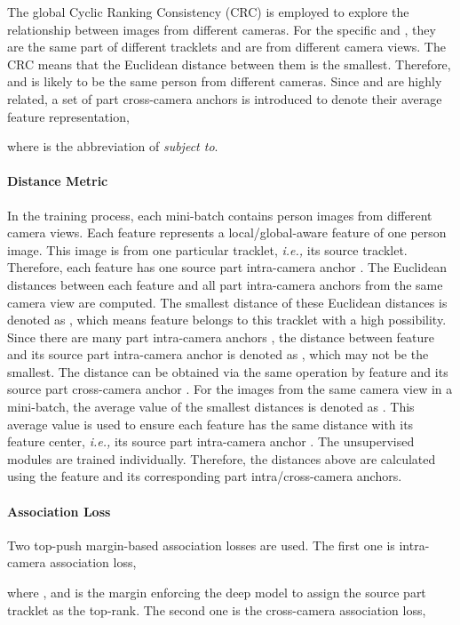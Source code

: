 \documentclass{cta-author}
\begin{document}
	The global Cyclic Ranking Consistency (CRC) \cite{RN187} is employed to explore the relationship between images from different cameras. For the specific  and , they are the same part of different tracklets and are from different camera views. The CRC means that the Euclidean distance between them is the smallest. Therefore,  and  is likely to be the same person from different cameras. Since  and  are highly related, a set of part cross-camera anchors  is introduced to denote their average feature representation, 
	
	where  is the abbreviation of \textit{subject to}.
	
	\paragraph{Distance Metric}
	In the training process, each mini-batch contains  person images from different camera views. Each feature  represents a local/global-aware feature of one person image. This image is from one particular tracklet, \textit{i.e.,} its source tracklet. Therefore, each feature  has one source part intra-camera anchor . The Euclidean distances between each feature  and all part intra-camera anchors  from the same camera view are computed. The smallest distance of these Euclidean distances is denoted as , which means feature  belongs to this tracklet with a high possibility. Since there are many part intra-camera anchors , the distance between feature  and its source part intra-camera anchor  is denoted as , which may not be the smallest. The distance  can be obtained via the same operation by feature  and its source part cross-camera anchor . For the images from the same camera view in a mini-batch, the average value of the smallest distances  is denoted as . This average value  is used to ensure each feature has the same distance with its feature center, \textit{i.e.,} its source part intra-camera anchor . The  unsupervised modules are trained individually. Therefore, the distances above are calculated using the  feature and its corresponding part intra/cross-camera anchors.
	
	\paragraph{Association Loss}
	Two top-push margin-based association losses are used. The first one is intra-camera association loss,
	
	where , and  is the margin enforcing the deep model to assign the source part tracklet as the top-rank. The second one is the cross-camera association loss,
	
\end{document}
